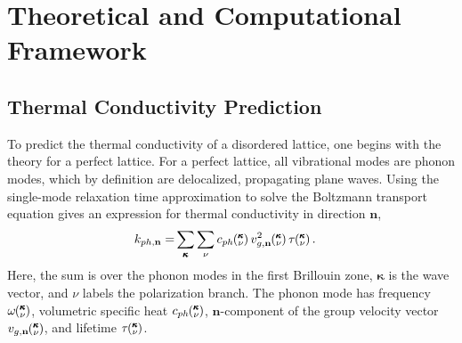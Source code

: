 
\section{\label{S:Theoretical}Theoretical and Computational Framework}

\subsection{\label{S:Thermal Theory}
Thermal Conductivity Prediction}

To predict the thermal conductivity of a disordered lattice, 
one begins with the theory for a perfect lattice. For a perfect lattice, 
all vibrational modes are phonon modes, which by 
definition are delocalized, propagating plane waves.
\cite{ziman_electrons_2001} Using the single-mode relaxation
time approximation \cite{ziman_electrons_2001} to solve 
the Boltzmann transport equation gives an 
expression for thermal conductivity in direction $\mathbf{n}$,
\begin{equation}\label{EQ:k_vib}
\begin{split}
k_{ph,\mathbf{n}}=&\sum_{\pmb{\kappa}} \sum_\nu c_{ph}\kv 
v^{2}_{g,\mathbf{n}}\kv \tau\kv.
\end{split}
\end{equation}
Here, the sum is over the phonon modes in the first Brillouin 
zone, $\pmb{\kappa}$ is the wave vector, and 
$\nu$ labels the polarization branch.  
The phonon mode has frequency $\omega\mspace{-4.0mu}\left(\mspace{-8.0mu} \begin{smallmatrix}&\pmb{\kappa} \\&\nu \end{smallmatrix}\mspace{-3.0mu}\right)$, 
volumetric specific heat $c_{ph}\mspace{-4.0mu}\left(\mspace{-8.0mu} \begin{smallmatrix}&\pmb{\kappa} \\&\nu \end{smallmatrix}\mspace{-3.0mu}\right)$, 
$\mathbf{n}$-component of the 
group velocity vector ${v}_{g,\mathbf{n}}\mspace{-4.0mu}\left(\mspace{-8.0mu} \begin{smallmatrix}&\pmb{\kappa} \\&\nu \end{smallmatrix}\mspace{-3.0mu}\right)$, 
and lifetime $\tau\mspace{-4.0mu}\left(\mspace{-8.0mu} \begin{smallmatrix}&\pmb{\kappa} \\&\nu \end{smallmatrix}\mspace{-3.0mu}\right)$. 

